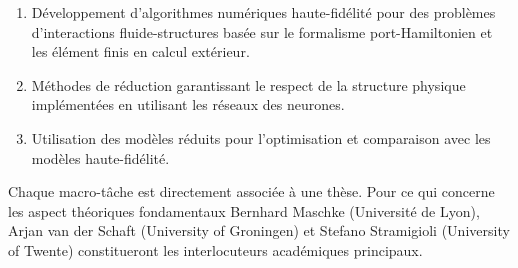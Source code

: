 \documentclass[12pt, french]{article}
\begin{document}
\begin{enumerate}
	\item Développement d'algorithmes numériques haute-fidélité pour des problèmes d'interactions fluide-structures basée sur le formalisme port-Hamiltonien et les élément finis en calcul extérieur.
	\item Méthodes de réduction garantissant le respect de la structure physique implémentées en utilisant les réseaux des neurones. 
	\item Utilisation des modèles réduits pour l'optimisation et comparaison avec les  modèles haute-fidélité.
\end{enumerate}

Chaque macro-tâche est directement associ\'ee \`a une thèse. Pour ce qui concerne les aspect théoriques fondamentaux Bernhard Maschke (Universit\'e de Lyon), Arjan van der Schaft (University of Groningen) et Stefano Stramigioli (University of Twente) constitueront les interlocuteurs académiques principaux.
\end{document}
